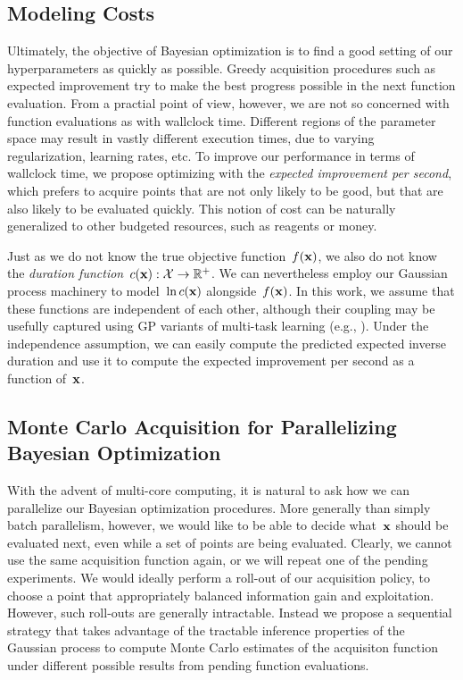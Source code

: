 \documentclass[aos,preprint]{imsart}
\begin{document}
\subsection{Modeling Costs}
Ultimately, the objective of Bayesian optimization is to find a good
setting of our hyperparameters as quickly as possible.  Greedy
acquisition procedures such as expected improvement try to make the
best progress possible in the next function evaluation.  From a
practial point of view, however, we are not so concerned with function
evaluations as with wallclock time.  Different regions of the
parameter space may result in vastly different execution times, due to
varying regularization, learning rates, etc.  To improve our
performance in terms of wallclock time, we propose optimizing with the
\emph{expected improvement per second}, which prefers to acquire
points that are not only likely to be good, but that are also likely
to be evaluated quickly.  This notion of cost can be naturally
generalized to other budgeted resources, such as reagents or money.

Just as we do not know the true objective function~$f(\boldsymbol{\mathrm{x}})$, we also
do not know the \emph{duration
  function}~${c(\boldsymbol{\mathrm{x}}):\mathcal{X}\to\mathbb{R}^{+}}$.  We can nevertheless
employ our Gaussian process machinery to model~$\ln c(\boldsymbol{\mathrm{x}})$
alongside~$f(\boldsymbol{\mathrm{x}})$.  In this work, we assume that these functions
are independent of each other, although their coupling may be usefully
captured using GP variants of multi-task learning (e.g., \citet{teh-etal-2005a,bonilla-etal-2008a}).
Under the independence assumption, we can easily compute the predicted
expected inverse duration and use it to compute the expected
improvement per second as a function of~$\boldsymbol{\mathrm{x}}$.

\subsection{Monte Carlo Acquisition for Parallelizing Bayesian Optimization}
With the advent of multi-core computing, it is natural to ask how we
can parallelize our Bayesian optimization procedures.  More generally
than simply batch parallelism, however, we would like to be able to
decide what~$\boldsymbol{\mathrm{x}}$ should be evaluated next, even while a set of
points are being evaluated.  Clearly, we cannot use the same
acquisition function again, or we will repeat one of the pending
experiments.  We would ideally perform a roll-out of our acquisition
policy, to choose a point that appropriately balanced information gain
and exploitation.  However, such roll-outs are generally intractable.
Instead we propose a sequential strategy that takes advantage of the
tractable inference properties of the Gaussian process to compute
Monte Carlo estimates of the acquisiton function under different
possible results from pending function evaluations.
\end{document}
